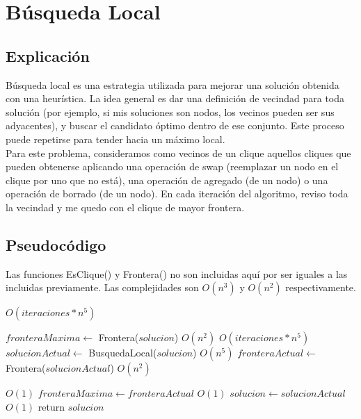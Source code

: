 \section{Búsqueda Local}

\subsection{Explicación}

Búsqueda local es una estrategia utilizada para mejorar una solución obtenida con una heurística. La idea general es dar una definición de vecindad para toda solución (por ejemplo, si mis soluciones son nodos, los vecinos pueden ser sus adyacentes), y buscar el candidato óptimo dentro de ese conjunto. Este proceso puede repetirse para tender hacia un máximo local. \\

Para este problema, consideramos como vecinos de un clique aquellos cliques que pueden obtenerse aplicando una operación de swap (reemplazar un nodo en el clique por uno que no está), una operación de agregado (de un nodo) o una operación de borrado (de un nodo). En cada iteración del algoritmo, reviso toda la vecindad y me quedo con el clique de mayor frontera.


\subsection{Pseudocódigo}

Las funciones EsClique() y Frontera() no son incluidas aquí por ser iguales a las incluidas previamente. Las complejidades son $O(n^3)$ y $O(n^2)$ respectivamente. \\

\begin{algorithm}[H]
\begin{algorithmic}
          \Comment $O(iteraciones * n^5)$

    \State $fronteraMaxima \gets$ Frontera($solucion$)                      \Comment $O(n^2)$
                                             \Comment $O(iteraciones * n^5)$
        \State $solucionActual \gets$ BusquedaLocal($solucion$)             \Comment $O(n^5)$
        \State $fronteraActual \gets$ Frontera($solucionActual$)            \Comment $O(n^2)$

                                      \Comment $O(1)$
            \State $fronteraMaxima \gets fronteraActual$                    \Comment $O(1)$
            \State $solucion \gets solucionActual$                          \Comment $O(1)$
        \EndIf
    \EndFor
    \State return $solucion$

\EndFunction
\end{algorithmic}
\end{algorithm}

